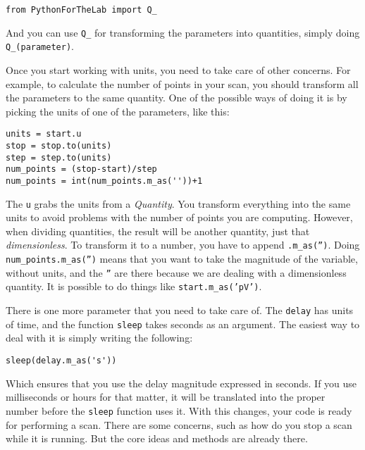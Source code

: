 \begin{verbatim}
from PythonForTheLab import Q_
\end{verbatim}

And you can use \texttt{Q_} for transforming the parameters into
quantities, simply doing \texttt{Q_(parameter)}.


Once you start working with units, you need to take care of other
concerns. For example, to calculate the number of points in your scan,
you should transform all the parameters to the same quantity. One of the
possible ways of doing it is by picking the units of one of the
parameters, like this:

\begin{verbatim}
units = start.u
stop = stop.to(units)
step = step.to(units)
num_points = (stop-start)/step
num_points = int(num_points.m_as(''))+1
\end{verbatim}

The \texttt{u} grabs the units from a \emph{Quantity}. You transform
everything into the same units to avoid problems with the number of
points you are computing. However, when dividing quantities, the result
will be another quantity, just that \emph{dimensionless}. To transform
it to a number, you have to append
\texttt{.m_as('')}. Doing
\texttt{num_points.m_as('')} means
that you want to take the magnitude of the variable, without units, and
the \texttt{''} are there because we
are dealing with a dimensionless quantity. It is possible to do things
like \texttt{start.m_as('pV')}.

There is one more parameter that you need to take care of. The
\texttt{delay} has units of time, and the function \texttt{sleep} takes
seconds as an argument. The easiest way to deal with it is simply
writing the following:

\begin{verbatim}
sleep(delay.m_as('s'))
\end{verbatim}

Which ensures that you use the delay magnitude expressed in seconds. If
you use milliseconds or hours for that matter, it will be translated
into the proper number before the \texttt{sleep} function uses it. With
this changes, your code is ready for performing a scan. There are some
concerns, such as how do you stop a scan while it is running. But the
core ideas and methods are already there.

